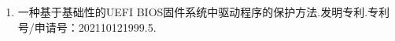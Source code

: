 \begin{APP2}
\begin{enumerate}

    \item 一种基于基础性的UEFI BIOS固件系统中驱动程序的保护方法.发明专利.专利号/申请号：202110121999.5.
    
\end{enumerate}
\end{APP2}

